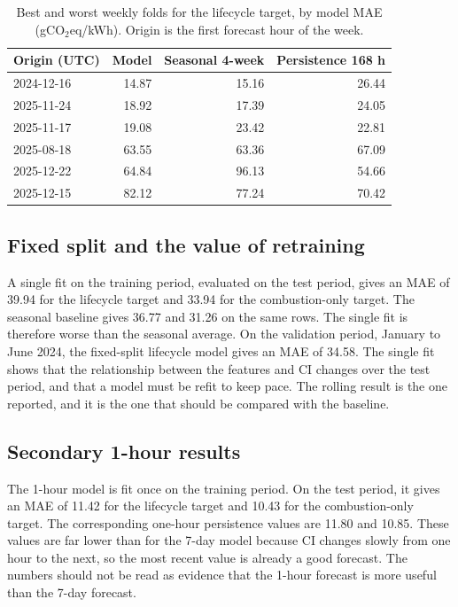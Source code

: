 \documentclass[10pt,journal,compsoc]{IEEEtran}
\begin{document}
\begin{table}[t]
\caption{Best and worst weekly folds for the lifecycle target, by model MAE (gCO$_2$eq/kWh). Origin is the first forecast hour of the week.}
\label{tab:weeks}
\centering
\small
\begin{tabular}{@{}lrrr@{}}
\toprule
Origin (UTC) & Model & Seasonal 4-week & Persistence 168 h \\
\midrule
2024-12-16 & 14.87 & 15.16 & 26.44 \\
2025-11-24 & 18.92 & 17.39 & 24.05 \\
2025-11-17 & 19.08 & 23.42 & 22.81 \\
\midrule
2025-08-18 & 63.55 & 63.36 & 67.09 \\
2025-12-22 & 64.84 & 96.13 & 54.66 \\
2025-12-15 & 82.12 & 77.24 & 70.42 \\
\bottomrule
\end{tabular}
\end{table}

\subsection{Fixed split and the value of retraining}
A single fit on the training period, evaluated on the test period, gives an MAE of 39.94 for the lifecycle target and 33.94 for the combustion-only target. The seasonal baseline gives 36.77 and 31.26 on the same rows. The single fit is therefore worse than the seasonal average. On the validation period, January to June 2024, the fixed-split lifecycle model gives an MAE of 34.58. The single fit shows that the relationship between the features and CI changes over the test period, and that a model must be refit to keep pace. The rolling result is the one reported, and it is the one that should be compared with the baseline.

\subsection{Secondary 1-hour results}
The 1-hour model is fit once on the training period. On the test period, it gives an MAE of 11.42 for the lifecycle target and 10.43 for the combustion-only target. The corresponding one-hour persistence values are 11.80 and 10.85. These values are far lower than for the 7-day model because CI changes slowly from one hour to the next, so the most recent value is already a good forecast. The numbers should not be read as evidence that the 1-hour forecast is more useful than the 7-day forecast.
\end{document}
